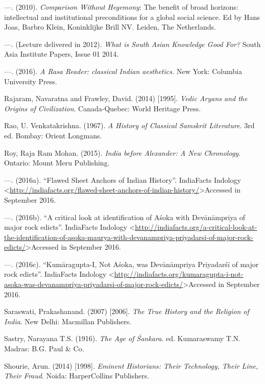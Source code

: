 \begin{thebibliography}{99}
  —. (2010). \textit{Comparison Without Hegemony}: The benefit of broad horizons: intellectual and institutional preconditions for a global social science. Ed by Hans Joas, Barbro Klein, Koninklijke Brill NV. Leiden, The Netherlands.

  —. (Lecture delivered in 2012). \textit{What is South Asian Knowledge Good For?} South Asia Institute Papers, Issue 01 2014.

  —. (2016). \textit{A Rasa Reader: classical Indian aesthetics.} New York: Columbia University Press.

  Rajaram, Navaratna and Frawley, David. (2014) [1995]. \textit{Vedic Aryans and the Origins of Civilization}. Canada-Quebec: World Heritage Press.

  Rao, U. Venkatakrishna. (1967). \textit{A History of Classical Samskrit Literature}. 3rd ed. Bombay: Orient Longmans.

  Roy, Raja Ram Mohan. (2015). \textit{India before Alexander: A New Chronology}. Ontario: Mount Meru Publishing.

  —. (2016a). “Flawed Sheet Anchors of Indian History”. IndiaFacts Indology \textless \underline{http://indiafacts.org/flawed-sheet-anchors-of-indian-history/}\textgreater  Accessed in September 2016.

  —. (2016b). “A critical look at identification of Aśoka with Devānāmpriya of major rock edicts”. IndiaFacts Indology \textless \url{http://indiafacts.org/a-critical-look-at-the-identification-of-asoka-maurya-with-devanampriya-priyadarsi-of-major-rock-edicts/}\textgreater  Accessed in September 2016.

  —. (2016c). “Kumāragupta-I, Not Aśoka, was Devānāmpriya Priyadarśī of major rock edicts”. IndiaFacts Indology \textless \url{http://indiafacts.org/kumaragupta-i-not-asoka-was-devanampriya-priyadarsi-of-major-rock-edicts/}\textgreater  Accessed in September 2016.

  Saraswati, Prakashanand. (2007) [2006]. \textit{The True History and the Religion of India}. New Delhi: Macmillan Publishers.

  Sastry, Narayana T.S. (1916). \textit{The Age of Śankara}. ed. Kumaraswamy T.N. Madras: B.G. Paul \& Co.

  Shourie, Arun. (2014) [1998]. \textit{Eminent Historians: Their Technology, Their Line, Their Fraud}. Noida: HarperCollins Publishers.


\end{thebibliography}
